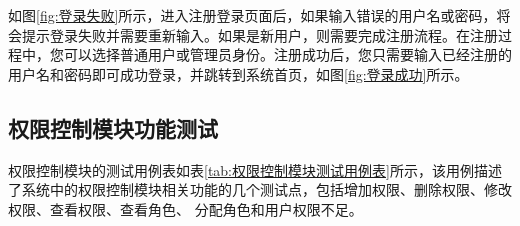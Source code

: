 如图\ref{fig:登录失败}所示，进入注册登录页面后，如果输入错误的用户名或密码，将会提示登录失败并需要重新输入。如果是新用户，则需要完成注册流程。在注册过程中，您可以选择普通用户或管理员身份。注册成功后，您只需要输入已经注册的用户名和密码即可成功登录，并跳转到系统首页，如图\ref{fig:登录成功}所示。



\subsection{权限控制模块功能测试}

权限控制模块的测试用例表如表\ref{tab:权限控制模块测试用例表}所示，该用例描述了系统中的权限控制模块相关功能的几个测试点，包括增加权限、删除权限、修改权限、查看权限、查看角色、
分配角色和用户权限不足。

